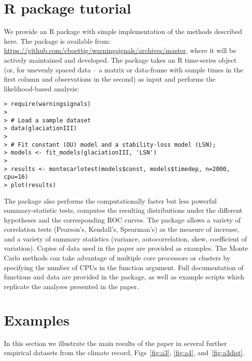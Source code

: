 \documentclass[authoryear, preprint,review,12pt]{elsarticle}
\begin{document}
\section{R package tutorial}\label{R}
We provide an R package with simple implementation of the methods described here.  The package is available from: \href{https://github.com/cboettig/warningsignals/archives/master}{https://github.com/cboettig/warningsignals/archives/master}, where it will be actively maintained and developed.  The package takes an R time-series object (or, for unevenly spaced data -- a matrix or data-frame with sample times in the first column and observations in the second) as input and performs the likelihood-based analysis:

\begin{verbatim}
> require(warningsignals)
>
> # Load a sample dataset
> data(glaciationIII)
>
> # Fit constant (OU) model and a stability-loss model (LSN);
> models <- fit_models(glaciationIII, 'LSN')
>
> results <- montecarlotest(models$const, models$timedep, n=2000, cpu=16)
> plot(results)
\end{verbatim}

The package also performs the computationally faster but less powerful summary-statistic tests, computes the resulting distributions under the different hypotheses and the corresponding ROC curves.  The package allows a variety of correlation tests (Pearson's, Kendall's, Spearman's) as the measure of increase, and a variety of summary statistics (variance, autocorrelation, skew, coefficient of variation).  Copies of data used in the paper are provided as examples.  The Monte Carlo methods can take advantage of multiple core processors or clusters by specifying the number of CPUs in the function argument.   Full documentation of functions and data are provided in the package, as well as example scripts which replicate the analyses presented in the paper.   

\section{Examples}\label{examples}
In this section we illustrate the main results of the paper in several further empirical datasets from the climate record, Figs~\ref{fig:a3}, \ref{fig:a4}, and~\ref{fig:a3dist}.  
\end{document}
